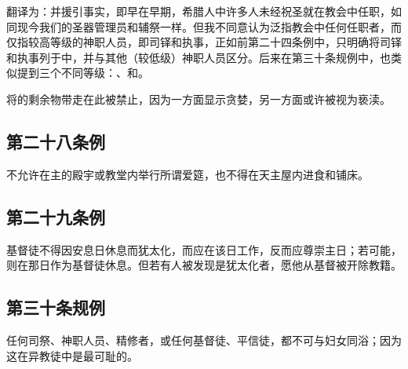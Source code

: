 翻译为：并援引事实，即早在早期，希腊人中许多人未经祝圣就在教会中任职，如同现今我们的圣器管理员和辅祭一样。但我不同意认为泛指教会中任何任职者，而仅指较高等级的神职人员，即司铎和执事，正如前第二十四条例中，只明确将司铎和执事列于中，并与其他（较低级）神职人员区分。后来在第三十条规例中，也类似提到三个不同等级：、和。\par

将的剩余物带走在此被禁止，因为一方面显示贪婪，另一方面或许被视为亵渎。\par


\subsection{第二十八条例}

不允许在主的殿宇或教堂内举行所谓爱筵，也不得在天主屋内进食和铺床。\par


\subsection{第二十九条例}

基督徒不得因安息日休息而犹太化，而应在该日工作，反而应尊崇主日；若可能，则在那日作为基督徒休息。但若有人被发现是犹太化者，愿他从基督被开除教籍。\par


\subsection{第三十条规例}

任何司祭、神职人员、精修者，或任何基督徒、平信徒，都不可与妇女同浴；因为这在异教徒中是最可耻的。\par


